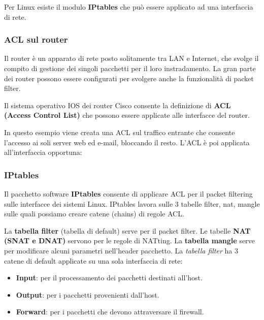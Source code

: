            Per Linux esiste il modulo \textbf{IPtables} che può essere applicato ad una interfaccia di rete.

        \subsubsection{ACL sul router}
            Il router è un apparato di rete posto solitamente tra LAN e Internet, che svolge il compito di gestione dei singoli pacchetti per il loro instradamento. La gran parte dei router possono essere configurati per svolgere anche la funzionalità di packet filter.

            Il sistema operativo IOS dei router Cisco consente la definizione di \textbf{ACL (Access Control List)} che possono essere applicate alle interfacce del router.
        
            In questo esempio viene creata una ACL sul traffico entrante che consente l'accesso ai soli server web ed e-mail, bloccando il resto. L'ACL è poi applicata all'interfaccia opportuna:

            

        \subsubsection{IPtables}
            Il pacchetto software \textbf{IPtables} consente di applicare ACL per il packet filtering sulle interfacce dei sistemi Linux. IPtables lavora sulle 3 tabelle filter, nat, mangle sulle quali possiamo creare catene (chains) di regole ACL.
        
            La \textbf{tabella filter} (tabella di default) serve per il packet filter.
            Le tabelle \textbf{NAT (SNAT e DNAT)} servono per le regole di NATting. La \textbf{tabella mangle} serve per modificare alcuni parametri nell'header pacchetto. La \textit{tabella filter} ha 3 catene di default applicate su una sola interfaccia di rete:
            \begin{itemize}
                \item \textbf{Input}: per il processamento dei pacchetti destinati all'host.
                \item \textbf{Output}: per i pacchetti provenienti dall'host.
                \item \textbf{Forward}: per i pacchetti che devono attraversare il firewall.
            \end{itemize}

